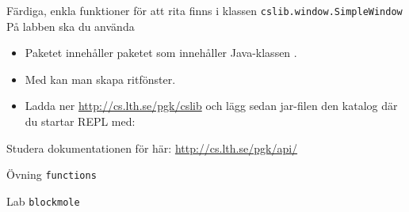 \begin{Slide}{Färdiga, enkla funktioner för att rita finns i klassen \texttt{cslib.window.SimpleWindow}}
På labben ska du använda 
\begin{itemize}
\item Paketet  innehåller paketet  som innehåller Java-klassen .
\item Med  kan man skapa ritfönster.
\item Ladda ner \url{http://cs.lth.se/pgk/cslib} och lägg sedan jar-filen den katalog där du startar REPL med: 
\end{itemize}
\pause
{}
\pause Studera dokumentationen för  här: \url{http://cs.lth.se/pgk/api/}
\end{Slide}


\ifkompendium\else



\begin{Slide}{Övning \texttt{functions}}\SlideFontTiny
\setlength{\leftmargini}{0pt}
\begin{itemize}

\end{itemize}
\end{Slide}

\begin{Slide}{Lab \texttt{blockmole}}%
\begin{itemize}

\end{itemize}

\end{Slide}
\fi
